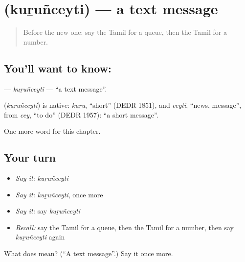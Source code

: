\section[\texorpdfstring{\ta{குறுஞ்செய்தி} (kuṟuñceyti)}{குறுஞ்செய்தி (kuṟuñceyti)}]{ (kuṟuñceyti) — a text message}

\label{lesson:TA-C185-kurunceyti}



\begin{quote}
Before the new one: say the Tamil for a queue, then the Tamil for a number.
\end{quote}

\subsection*{You'll want to know: }
\textbf{} — \emph{kuṟuñceyti} — \textquotedblleft{}a text message\textquotedblright{}.

\begin{cousinweb}
\textbf{} (\emph{kuṟuñceyti}) is native: \emph{kuṟu}, \textquotedblleft{}short\textquotedblright{} (DEDR 1851), and \emph{ceyti}, \textquotedblleft{}news, message\textquotedblright{}, from \emph{cey}, \textquotedblleft{}to do\textquotedblright{} (DEDR 1957): \textquotedblleft{}a short message\textquotedblright{}.
\end{cousinweb}

\begin{grammarlens}[title={What you've built}]
One more word for this chapter.
\end{grammarlens}

\subsection*{Your turn}
\begin{itemize}
\raggedright
  \item \emph{Say it:} \emph{kuṟuñceyti}
  \item \emph{Say it:} \emph{kuṟuñceyti}, once more
  \item \emph{Say it:} say \emph{kuṟuñceyti}
  \item \emph{Recall:} say the Tamil for a queue, then the Tamil for a number, then say \emph{kuṟuñceyti} again
\end{itemize}

\begin{tcolorbox}[breakable,colback=teal!4,colframe=teal!35!black,title={Before you move on}]
What does  mean? (\textquotedblleft{}A text message\textquotedblright{}.) Say it once more.
\end{tcolorbox}
